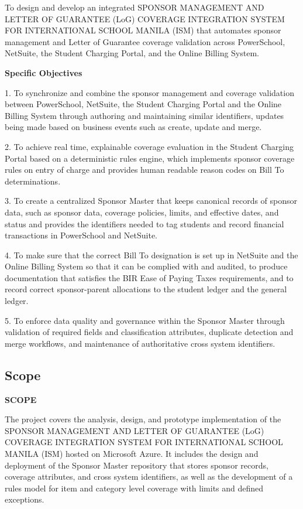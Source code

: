 \documentclass[12pt,a4paper]{article}
\begin{document}
To design and develop an integrated SPONSOR MANAGEMENT AND LETTER OF GUARANTEE (LoG) COVERAGE INTEGRATION SYSTEM FOR INTERNATIONAL SCHOOL MANILA (ISM) that automates sponsor management and Letter of Guarantee coverage validation across PowerSchool, NetSuite, the Student Charging Portal, and the Online Billing System.

\textbf{Specific Objectives}

1. To synchronize and combine the sponsor management and coverage validation between PowerSchool, NetSuite, the Student Charging Portal and the Online Billing System through authoring and maintaining similar identifiers, updates being made based on business events such as create, update and merge.

2. To achieve real time, explainable coverage evaluation in the Student Charging Portal based on a deterministic rules engine, which implements sponsor coverage rules on entry of charge and provides human readable reason codes on Bill To determinations.

3. To create a centralized Sponsor Master that keeps canonical records of sponsor data, such as sponsor data, coverage policies, limits, and effective dates, and status and provides the identifiers needed to tag students and record financial transactions in PowerSchool and NetSuite.

4. To make sure that the correct Bill To designation is set up in NetSuite and the Online Billing System so that it can be complied with and audited, to produce documentation that satisfies the BIR Ease of Paying Taxes requirements, and to record correct sponsor-parent allocations to the student ledger and the general ledger.

5. To enforce data quality and governance within the Sponsor Master through validation of required fields and classification attributes, duplicate detection and merge workflows, and maintenance of authoritative cross system identifiers.

\subsection{Scope}

\textbf{SCOPE}

The project covers the analysis, design, and prototype implementation of the SPONSOR MANAGEMENT AND LETTER OF GUARANTEE (LoG) COVERAGE INTEGRATION SYSTEM FOR INTERNATIONAL SCHOOL MANILA (ISM) hosted on Microsoft Azure. It includes the design and deployment of the Sponsor Master repository that stores sponsor records, coverage attributes, and cross system identifiers, as well as the development of a rules model for item and category level coverage with limits and defined exceptions.
\end{document}
